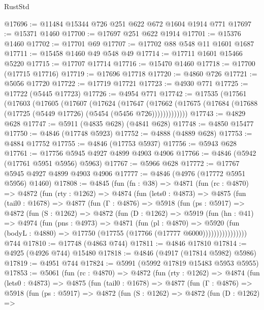 \begin{lexlean}{RustStd}
\begin{coremodule}
@17696 := @11484 @15344 @726 @251 @622 @672 @1604 @1914 @771
@17697 := @15371 @1460
@17700 := @17697 @251 @622 @1914
@17701 := @15376 @1460
@17702 := @17701 @69
@17707 := @17702 @88 @548 @11 @1601 @1687
@17711 := @15458 @1460 @49 @548 @49
@17714 := @17711 @1601 @15466 @5220
@17715 := @17707 @17714
@17716 := @15470 @1460
@17718 := @17700 (@17715 @17716)
@17719 := @17696 @17718
@17720 := @4860 @726
@17721 := @5056 @17720
@17722 := @17719 @17721
@17723 := @4930 @771
@17725 := @17722 (@5445 @17723)
@17726 := @4954 @771
@17742 := @17535
    (@17561
      (@17603
        (@17605
          (@17607
            (@17624
              (@17647
                (@17662
                  (@17675 (@17684 (@17688 (@17725 (@5449 @17726) (@5454 (@5456 @726)))))))))))))
@17743 := @4829 @628
@17747 := @5911 (@4835 @628) (@4841 @628)
@17748 := @4850 @15477
@17750 := @4846 (@17748 @5923)
@17752 := @4888 (@4889 @628)
@17753 := @4884 @17752
@17755 := @4846 (@17753 @5937)
@17756 := @5943 @628
@17761 := @17756 @5945 @4927 @4899 @4903 @4906
@17766 := @4846 (@5942 (@17761 @5951 @5956) @5963)
@17767 := @5966 @628
@17772 := @17767 @5945 @4927 @4899 @4903 @4906
@17777 := @4846 (@4976 (@17772 @5951 @5956) @1460)
@17808 := @4845
    (fun (fn : @38) =>
    @4871
      (fun (rc : @4870) =>
      @4872
        (fun (rty : @1262) =>
        @4874
          (fun (lets0 : @4873) =>
          @4875
            (fun (tail0 : @1678) =>
            @4877
              (fun (Γ : @4876) =>
              @5918
                (fun (ps : @5917) =>
                @4872
                  (fun (S : @1262) =>
                  @4872
                    (fun (D : @1262) =>
                    @5919
                      (fun (hn : @41) =>
                      @4974
                        (fun (pns : @4973) =>
                        @4871
                          (fun (pl : @4870) =>
                          @5920
                            (fun (bodyL : @4880) =>
                            @17750 (@17755 (@17766 (@17777 @6000))))))))))))))))
    @744
@17810 := @17748 (@4863 @744)
@17811 := @4846 @17810
@17814 := @4925 (@4926 @744) @15480
@17818 := @4846 (@4917 (@17814 @5982) @5986)
@17819 := @4951 @744
@17824 := @5991 (@5992 @17819 @15483 @5953 @5955)
@17853 := @5061
    (fun (rc : @4870) =>
    @4872
      (fun (rty : @1262) =>
      @4874
        (fun (lets0 : @4873) =>
        @4875
          (fun (tail0 : @1678) =>
          @4877
            (fun (Γ : @4876) =>
            @5918
              (fun (ps : @5917) =>
              @4872
                (fun (S : @1262) =>
                @4872
                  (fun (D : @1262) =>

\end{coremodule}
\end{lexlean}

